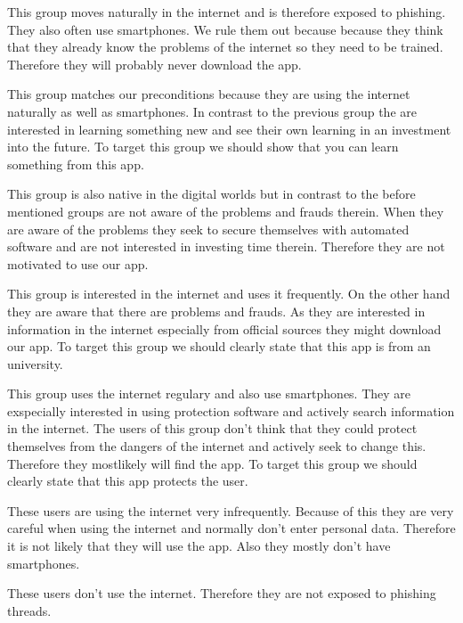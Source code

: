 \begin{description}[leftmargin=0cm]
\item[Digital Souver\"{a}ne] This group moves naturally in the internet and is therefore exposed to phishing. They also often use smartphones. We rule them out because because they think that they already know the problems of the internet so they need to be trained. Therefore they will probably never download the app.
\item[Effizienzorientierte Performer] This group matches our preconditions because they are using the internet naturally as well as smartphones. In contrast to the previous group the are interested in learning something new and see their own learning in an investment into the future. To target this group we should show that you can learn something from this app.
\item[Unbek\"{u}mmerte Hedonisten] This group is also native in the digital worlds but in contrast to the before mentioned groups are not aware of the problems and frauds therein. When they are aware of the problems they seek to secure themselves with automated software and are not interested in investing time therein. Therefore they are not motivated to use our app.
\item[Postmaterielle Skeptiker] This group is interested in the internet and uses it frequently. On the other hand they are aware that there are problems and frauds. As they are interested in information in the internet especially from official sources they might download our app. To target this group we should clearly state that this app is from an university.
\item[Verantwortungsbedachte Etablierte] This group uses the internet regulary and also use smartphones. They are exspecially interested in using protection software and actively search information in the internet. The users of this group don't think that they could protect themselves from the dangers of the internet and actively seek to change this. Therefore they mostlikely will find the app. To target this group we should clearly state that this app protects the user.
\item[Ordnungsfordernde Internet-Laien] These users are using the internet very infrequently. Because of this they are very careful when using the internet and normally don't enter personal data. Therefore it is not likely that they will use the app. Also they mostly don't have smartphones.
\item[Internetferne Verunsicherte] These users don't use the internet. Therefore they are not exposed to phishing threads.
\end{description}

